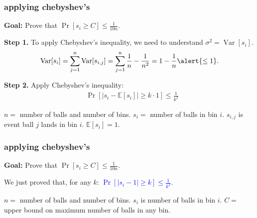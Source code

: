 \documentclass[compress]{beamer}
\newcommand{\blue}[1]{\textcolor{blue}{#1}}
\newcommand{\E}{\mathbb{E}}
\DeclareMathOperator{\Var}{Var}
\begin{document}
\begin{frame}
	\frametitle{applying chebyshev's}
	\textbf{Goal:} Prove that $\Pr[s_i \geq C] \leq \frac{1}{10n}$. 
	
	\textbf{Step 1.} To apply Chebyshev's inequality, we need to understand $\sigma^2 = \Var[s_i]$. 
	\begin{align*}
		\Var[s_i] = \sum_{j=1}^n \Var[s_{i,j}] = \sum_{j=1}^n \frac{1}{n} - \frac{1}{n^2} = {1- \frac{1}{n} \alert{\leq 1}.}
	\end{align*}
	
	\textbf{Step 2.} Apply Chebyshev's inequality:
	\begin{align*}
		&\Pr\left[\left|s_i - \E[s_i]\right| \geq k\cdot 1\right] \leq \frac{1}{k^2}
	\end{align*}
	
	\vspace{0em}
	\begin{block}{\vspace*{-3ex}}
		\small $n = $ number of balls and number of bins. $s_i=$ number of balls in bin $i$.  $s_{i,j}$ is event ball $j$ lands in bin $i$. $\E[s_i] = 1$. 
	\end{block}
\end{frame}

\begin{frame}
	\frametitle{applying chebyshev's}
	\textbf{Goal:} Prove that $\Pr[s_i \geq C] \leq \frac{1}{10n}$. 
	
	We just proved that, for any $k$: \blue{$\Pr[\left|s_i - 1\right| \geq k] \leq \frac{1}{k^2}$.}
	\vspace{12em}
	
	
	\vspace{1em}
	\begin{block}{\vspace*{-3ex}}
		\small $n = $ number of balls and number of bins. $s_i$ is number of balls in bin $i$. $C =$ upper bound on maximum number of balls in any bin.
	\end{block}
\end{frame}
\end{document}
